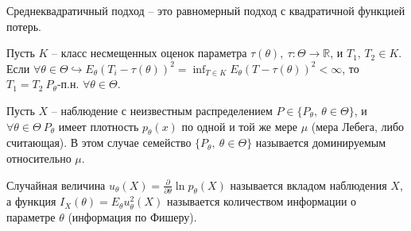 \begin{definition}
Среднеквадратичный подход -- это равномерный подход с квадратичной функцией потерь.
\end{definition}

\begin{exercise}
    Пусть $\displaystyle K$ -- класс несмещенных оценок параметра $\displaystyle \tau ( \theta ),\ \tau :\Theta \rightarrow \mathbb{R}$, и $\displaystyle T_{1},\, T_{2} \in K$. Если $\displaystyle \forall \theta \in \Theta \hookrightarrow E_{\theta }( T_{i} -\tau ( \theta ))^{2} =\inf_{T\in K} E_{\theta }( T-\tau ( \theta ))^{2} < \infty $, то $\displaystyle T_{1} =T_{2} \ P_{\theta }$-п.н. $\displaystyle \forall \theta \in \Theta $.
\end{exercise}


\begin{definition}
Пусть $\displaystyle X$ -- наблюдение с неизвестным распределением $\displaystyle P\in \{P_{\theta },\ \theta \in \Theta \}$, и $\displaystyle \forall \theta \in \Theta\ P_{\theta }$ имеет плотность $\displaystyle p_{\theta }( x)$ по одной и той же мере $\displaystyle \mu $ (мера Лебега, либо считающая). В этом случае семейство $\displaystyle \{P_{\theta },\ \theta \in \Theta \}$ называется доминируемым относительно $\displaystyle \mu $.
\end{definition}
\begin{definition}
Случайная величина $\displaystyle u_{\theta }( X) =\frac{\partial }{\partial \theta }\ln p_{\theta }( X)$ называется вкладом наблюдения $\displaystyle X$, а функция $\displaystyle I_{X}( \theta ) =E_{\theta } u_{\theta }^{2}( X)$ называется количеством информации о параметре $\displaystyle \theta $ (информация по Фишеру).
\end{definition}

